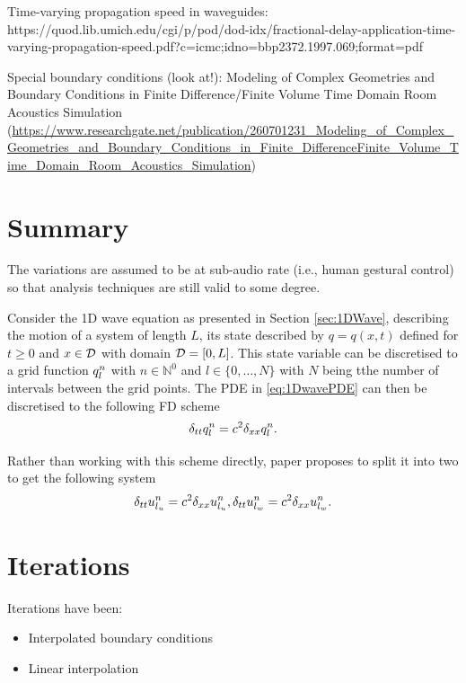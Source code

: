 Time-varying propagation speed in waveguides: https://quod.lib.umich.edu/cgi/p/pod/dod-idx/fractional-delay-application-time-varying-propagation-speed.pdf?c=icmc;idno=bbp2372.1997.069;format=pdf

Special boundary conditions (look at!):
Modeling of Complex Geometries and Boundary Conditions in Finite Difference/Finite Volume Time Domain Room Acoustics Simulation (\url{https://www.researchgate.net/publication/260701231_Modeling_of_Complex_Geometries_and_Boundary_Conditions_in_Finite_DifferenceFinite_Volume_Time_Domain_Room_Acoustics_Simulation})



\section{Summary}
The variations are assumed to be at sub-audio rate (i.e., human gestural control) so that analysis techniques are still valid to some degree.


Consider the 1D wave equation  as presented in Section \ref{sec:1DWave}, describing the motion of a system of length $L$, its state described by $q = q(x,t)$ defined for $t\geq 0$ and $x\in\mathcal{D}$ with domain $\mathcal{D} = [0, L]$. This state variable can be discretised to a grid function $q_l^n$ with $n\in \mathbb{N}^0$ and $l \in \{0, \hdots, N\}$ with $N$ being tthe number of intervals between the grid points. The PDE in \eqref{eq:1DwavePDE} can then be discretised to the following FD scheme
\begin{equation}
    \delta_{tt} q_l^n = c^2\delta_{xx} q_l^n.
\end{equation}

Rather than working with this scheme directly, paper \citeP[G] proposes to split it into two to get the following system 
\begin{subequations}
    \begin{equation}
        \delta_{tt} u_{l_u}^n = c^2\delta_{xx} u_{l_u}^n,
        \delta_{tt} u_{l_w}^n = c^2\delta_{xx} u_{l_w}^n.
    \end{equation}
\end{subequations}

\section{Iterations}
Iterations have been:
\begin{itemize}
    \item Interpolated boundary conditions
    \item Linear interpolation
\end{itemize}

